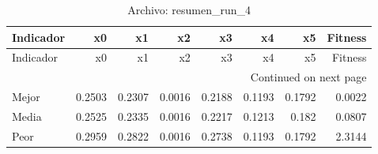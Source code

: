 \begin{longtable}{lrrrrrrr}
\caption{Archivo: resumen\_run\_4}\label{tab:resumen_run_4} \\
\toprule
Indicador & x0 & x1 & x2 & x3 & x4 & x5 & Fitness \\
\midrule
\endfirsthead
\toprule
Indicador & x0 & x1 & x2 & x3 & x4 & x5 & Fitness \\
\midrule
\endhead
\midrule
\multicolumn{8}{r}{Continued on next page} \\
\midrule
\endfoot
\bottomrule
\endlastfoot
Mejor & 0.2503 & 0.2307 & 0.0016 & 0.2188 & 0.1193 & 0.1792 & 0.0022 \\
Media & 0.2525 & 0.2335 & 0.0016 & 0.2217 & 0.1213 & 0.182 & 0.0807 \\
Peor & 0.2959 & 0.2822 & 0.0016 & 0.2738 & 0.1193 & 0.1792 & 2.3144 \\
\end{longtable}